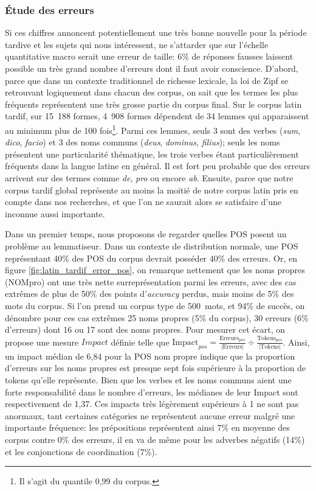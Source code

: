 \subsubsection{Étude des erreurs}

Si ces chiffres annoncent potentiellement une très bonne nouvelle pour la période tardive et les sujets qui nous intéressent, ne s'attarder que sur l'échelle quantitative macro serait une erreur de taille: 6\% de réponses fausses laissent possible un très grand nombre d'erreurs dont il faut avoir conscience. D'abord, parce que dans un contexte traditionnel de richesse lexicale, la loi de Zipf se retrouvant logiquement dans chacun des corpus, on sait que les termes les plus fréquents représentent une très grosse partie du corpus final. Sur le corpus latin tardif, sur 15~188 formes, 4~908 formes dépendent de 34 lemmes qui apparaissent au minimum plus de 100 fois\footnote{Il s'agit du quantile 0,99 du corpus.}. Parmi ces lemmes, seuls 3 sont des verbes (\textit{sum}, \textit{dico}, \textit{facio}) et 3 des noms communs (\textit{deus}, \textit{dominus}, \textit{filius}); seuls les noms présentent une particularité thématique, les trois verbes étant particulièrement fréquents dans la langue latine en général. Il est fort peu probable que des erreurs arrivent sur des termes comme \textit{de}, \textit{pro} ou encore \textit{ab}. Ensuite, parce que notre corpus tardif global représente au moins la moitié de notre corpus latin pris en compte dans nos recherches, et que l'on ne saurait alors se satisfaire d'une inconnue aussi importante.

Dans un premier temps, nous proposons de regarder quelles POS posent un problème au lemmatiseur. Dans un contexte de distribution normale, une POS représentant 40\% des POS du corpus devrait posséder 40\% des erreurs. Or, en figure \ref{fig:latin_tardif_error_pos}, on remarque nettement que les noms propres (NOMpro) ont une très nette surreprésentation parmi les erreurs, avec des cas extrêmes de plus de 50\% des points d'\textit{accuracy} perdus, mais moins de 5\% des mots du corpus. Si l'on prend un corpus type de 500~mots, et 94\% de succès, on dénombre pour ces cas extrêmes 25 noms propres (5\% du corpus), 30 erreurs (6\% d'erreurs) dont 16 ou 17 sont des noms propres. Pour mesurer cet écart, on propose une mesure $Impact$ définie telle que $\text{Impact}_{pos} = \frac{\text{Erreurs}_{pos}}{\left | \text{Erreurs} \right |} \div \frac{\text{Tokens}_{pos}}{\left | \text{Tokens} \right |}$. Ainsi, un impact médian de 6,84 pour la POS nom propre indique que la proportion d'erreurs sur les noms propres est presque sept fois supérieure à la proportion de tokens qu'elle représente. Bien que les verbes et les noms communs aient une forte responsabilité dans le nombre d'erreurs, les médianes de leur Impact sont respectivement de 1,37. Ces impacts très légèrement supérieurs à 1 ne sont pas anormaux, tant certaines catégories ne représentent aucune erreur malgré une importante fréquence: les prépositions représentent ainsi  7\% en moyenne des corpus contre 0\% des erreurs, il en va de même pour les adverbes négatifs (14\%) et les conjonctions de coordination (7\%).

